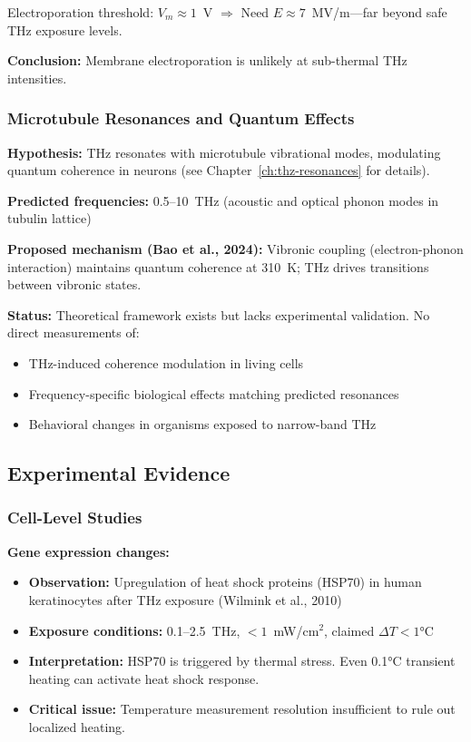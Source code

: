 Electroporation threshold: $V_m \approx 1$~V $\Rightarrow$ Need $E \approx 7$~MV/m---far beyond safe THz exposure levels.

\textbf{Conclusion:} Membrane electroporation is unlikely at sub-thermal THz intensities.

\subsubsection{Microtubule Resonances and Quantum Effects}

\textbf{Hypothesis:} THz resonates with microtubule vibrational modes, modulating quantum coherence in neurons (see Chapter~\ref{ch:thz-resonances} for details).

\textbf{Predicted frequencies:} 0.5--10~THz (acoustic and optical phonon modes in tubulin lattice)

\textbf{Proposed mechanism (Bao et al., 2024):} Vibronic coupling (electron-phonon interaction) maintains quantum coherence at 310~K; THz drives transitions between vibronic states.

\textbf{Status:} Theoretical framework exists but lacks experimental validation. No direct measurements of:
\begin{itemize}
\item THz-induced coherence modulation in living cells
\item Frequency-specific biological effects matching predicted resonances
\item Behavioral changes in organisms exposed to narrow-band THz
\end{itemize}

\subsection{Experimental Evidence}

\subsubsection{Cell-Level Studies}

\textbf{Gene expression changes:}
\begin{itemize}
\item \textbf{Observation:} Upregulation of heat shock proteins (HSP70) in human keratinocytes after THz exposure (Wilmink et al., 2010)
\item \textbf{Exposure conditions:} 0.1--2.5~THz, $<1$~mW/cm$^2$, claimed $\Delta T < 1°$C
\item \textbf{Interpretation:} HSP70 is triggered by thermal stress. Even 0.1°C transient heating can activate heat shock response.
\item \textbf{Critical issue:} Temperature measurement resolution insufficient to rule out localized heating.
\end{itemize}


